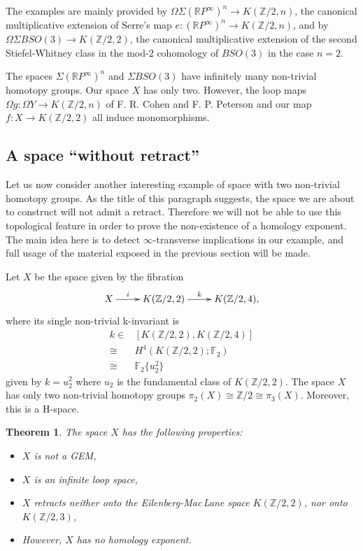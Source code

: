 \documentclass{amsart}
\newtheorem*{thm*}{Theorem}
\theoremstyle{definition}
\theoremstyle{remark}
\newcommand{\Z}{\mathbb{Z}}
\newcommand{\R}{\mathbb{R}}
\newcommand{\F}{\mathbb{F}}
\begin{document}
The examples are mainly provided by $\Omega\Sigma(\R P^\infty)^n\to K(\Z/2,n)$, the canonical multiplicative extension of Serre's map $e:(\R P^\infty)^n\to K(\Z/2,n)$, and by $\Omega\Sigma BSO(3)\to K(\Z/2,2)$, the canonical multiplicative extension of the second Stiefel-Whitney class in the mod-$2$ cohomology of $BSO(3)$ in the case $n=2$.

The spaces $\Sigma(\R P^\infty)^n$ and $\Sigma BSO(3)$ have infinitely many non-trivial homotopy groups. Our space $X$ has only two. However, the loop maps $\Omega g:\Omega Y\to K(\Z/2,n)$ of F. R. Cohen and F. P. Peterson and our map $f:X\to K(\Z/2,2)$ all induce monomorphisms.

\subsection{A space ``without retract''}\label{e:no_retract}

Let us now consider another interesting example of space with two non-trivial homotopy groups. As the title of this paragraph suggests, the space we are about to construct will not admit a retract. Therefore we will not be able to use this topological feature in order to prove the non-existence of a homology exponent. The main idea here is to detect $\infty$-transverse implications in our example, and full usage of the material exposed in the previous section will be made.

Let $X$ be the space given by the fibration
$$\xymatrix{
X\ar[r]^-i &K(\Z/2,2)\ar[r]^-k &K(\Z/2,4),
}$$
where its single non-trivial k-invariant is
\begin{align*}
k \in& [K(\Z/2,2),K(\Z/2,4)]\\
\cong &H^4(K(\Z/2,2);\F_2)\\
\cong &\F_2\{u_2^2\}
\end{align*}
given by $k=u_2^2$ where $u_2$ is the fundamental class of $K(\Z/2,2)$. The space $X$ has only two non-trivial homotopy groups $\pi_2(X)\cong\Z/2\cong\pi_3(X)$. Moreover, this is a H-space.

\begin{thm*}
The space $X$ has the following properties:
\begin{itemize}
\item[1.]{$X$ is not a GEM,}
\item[2.]{$X$ is an infinite loop space,}
\item[3.]{$X$ retracts neither onto the Eilenberg-Mac\,Lane space $K(\Z/2,2)$, nor onto $K(\Z/2,3)$,}
\item[4.]{However, $X$ has no homology exponent.}
\end{itemize}
\end{thm*}
\end{document}

